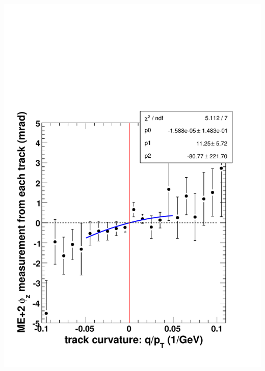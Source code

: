 \documentclass[compress]{beamer}
\begin{document}
\begin{frame}
\begin{columns}
\vspace{0.1 cm}
\includegraphics[width=\linewidth]{extrapolation_phiz.pdf}
\end{columns}
\end{frame}
\end{document}
